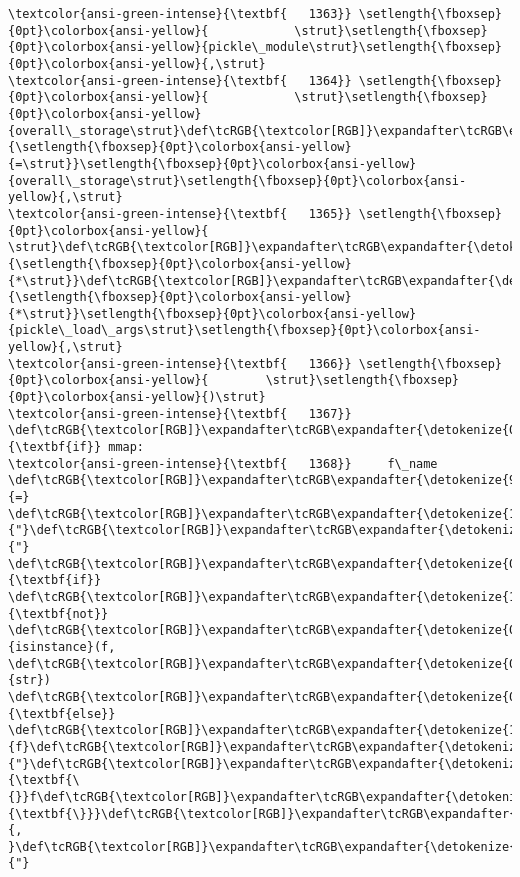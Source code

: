 \documentclass[11pt]{article}
\begin{document}
\begin{Verbatim}[commandchars=\\\{\}, frame=single, framerule=2mm, rulecolor=\color{outerrorbackground}]
\textcolor{ansi-green-intense}{\textbf{   1363}} \setlength{\fboxsep}{0pt}\colorbox{ansi-yellow}{            \strut}\setlength{\fboxsep}{0pt}\colorbox{ansi-yellow}{pickle\_module\strut}\setlength{\fboxsep}{0pt}\colorbox{ansi-yellow}{,\strut}
\textcolor{ansi-green-intense}{\textbf{   1364}} \setlength{\fboxsep}{0pt}\colorbox{ansi-yellow}{            \strut}\setlength{\fboxsep}{0pt}\colorbox{ansi-yellow}{overall\_storage\strut}\def\tcRGB{\textcolor[RGB]}\expandafter\tcRGB\expandafter{\detokenize{98,98,98}}{\setlength{\fboxsep}{0pt}\colorbox{ansi-yellow}{=\strut}}\setlength{\fboxsep}{0pt}\colorbox{ansi-yellow}{overall\_storage\strut}\setlength{\fboxsep}{0pt}\colorbox{ansi-yellow}{,\strut}
\textcolor{ansi-green-intense}{\textbf{   1365}} \setlength{\fboxsep}{0pt}\colorbox{ansi-yellow}{            \strut}\def\tcRGB{\textcolor[RGB]}\expandafter\tcRGB\expandafter{\detokenize{98,98,98}}{\setlength{\fboxsep}{0pt}\colorbox{ansi-yellow}{*\strut}}\def\tcRGB{\textcolor[RGB]}\expandafter\tcRGB\expandafter{\detokenize{98,98,98}}{\setlength{\fboxsep}{0pt}\colorbox{ansi-yellow}{*\strut}}\setlength{\fboxsep}{0pt}\colorbox{ansi-yellow}{pickle\_load\_args\strut}\setlength{\fboxsep}{0pt}\colorbox{ansi-yellow}{,\strut}
\textcolor{ansi-green-intense}{\textbf{   1366}} \setlength{\fboxsep}{0pt}\colorbox{ansi-yellow}{        \strut}\setlength{\fboxsep}{0pt}\colorbox{ansi-yellow}{)\strut}
\textcolor{ansi-green-intense}{\textbf{   1367}} \def\tcRGB{\textcolor[RGB]}\expandafter\tcRGB\expandafter{\detokenize{0,135,0}}{\textbf{if}} mmap:
\textcolor{ansi-green-intense}{\textbf{   1368}}     f\_name \def\tcRGB{\textcolor[RGB]}\expandafter\tcRGB\expandafter{\detokenize{98,98,98}}{=} \def\tcRGB{\textcolor[RGB]}\expandafter\tcRGB\expandafter{\detokenize{175,0,0}}{"}\def\tcRGB{\textcolor[RGB]}\expandafter\tcRGB\expandafter{\detokenize{175,0,0}}{"} \def\tcRGB{\textcolor[RGB]}\expandafter\tcRGB\expandafter{\detokenize{0,135,0}}{\textbf{if}} \def\tcRGB{\textcolor[RGB]}\expandafter\tcRGB\expandafter{\detokenize{175,0,255}}{\textbf{not}} \def\tcRGB{\textcolor[RGB]}\expandafter\tcRGB\expandafter{\detokenize{0,135,0}}{isinstance}(f, \def\tcRGB{\textcolor[RGB]}\expandafter\tcRGB\expandafter{\detokenize{0,135,0}}{str}) \def\tcRGB{\textcolor[RGB]}\expandafter\tcRGB\expandafter{\detokenize{0,135,0}}{\textbf{else}} \def\tcRGB{\textcolor[RGB]}\expandafter\tcRGB\expandafter{\detokenize{175,0,0}}{f}\def\tcRGB{\textcolor[RGB]}\expandafter\tcRGB\expandafter{\detokenize{175,0,0}}{"}\def\tcRGB{\textcolor[RGB]}\expandafter\tcRGB\expandafter{\detokenize{175,95,135}}{\textbf{\{}}f\def\tcRGB{\textcolor[RGB]}\expandafter\tcRGB\expandafter{\detokenize{175,95,135}}{\textbf{\}}}\def\tcRGB{\textcolor[RGB]}\expandafter\tcRGB\expandafter{\detokenize{175,0,0}}{, }\def\tcRGB{\textcolor[RGB]}\expandafter\tcRGB\expandafter{\detokenize{175,0,0}}{"}


\end{Verbatim}
\end{document}
